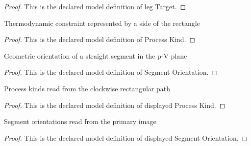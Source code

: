 \begin{proof}
  This is the declared model definition of leg Target.
\end{proof}
\begin{definition}
  \label{def:physics:phyx-mini-0480:phyxminiproblems-problemphyxmini0480-processkind}
  Thermodynamic constraint represented by a side of the rectangle
\end{definition}
\begin{proof}
  This is the declared model definition of Process Kind.
\end{proof}
\begin{definition}
  \label{def:physics:phyx-mini-0480:phyxminiproblems-problemphyxmini0480-segmentorientation}
  Geometric orientation of a straight segment in the p-V plane
\end{definition}
\begin{proof}
  This is the declared model definition of Segment Orientation.
\end{proof}
\begin{definition}
  \label{def:physics:phyx-mini-0480:phyxminiproblems-problemphyxmini0480-displayedprocesskind}
  Process kinds read from the clockwise rectangular path
\end{definition}
\begin{proof}
  This is the declared model definition of displayed Process Kind.
\end{proof}
\begin{definition}
  \label{def:physics:phyx-mini-0480:phyxminiproblems-problemphyxmini0480-displayedsegmentorientation}
  Segment orientations read from the primary image
\end{definition}
\begin{proof}
  This is the declared model definition of displayed Segment Orientation.
\end{proof}
